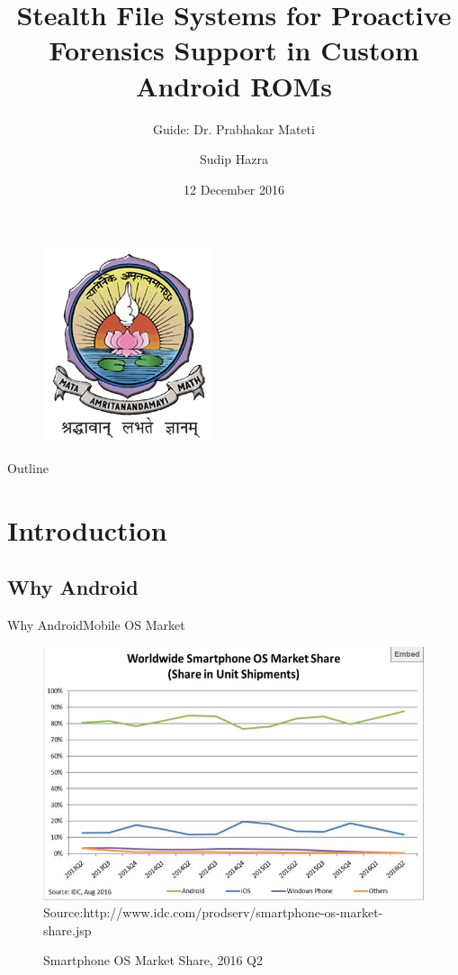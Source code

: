 \documentclass{beamer}
\title{Stealth File Systems for Proactive Forensics Support in Custom Android ROMs}
\author{Guide: Dr. Prabhakar Mateti\inst{1} \and Sudip Hazra\inst{2}}
\institute[Universities of Somewhere and Elsewhere] %
{
  \inst{1}%
  Wright State University
  \and
  \inst{2}%
  Amrita Centre For Cyber Security Systems and Networks\\
 Amrita University}
\date{12 December 2016}
\begin{document}
\begin{frame}
  \titlepage
  \centering
 
  \begin{figure}
  \centering
 \vspace{-.5cm}
  \includegraphics[width=.3\textwidth,height=.3\textheight]{images/AVV_colour}
  
  \end{figure}
  
 
\end{frame}

\begin{frame}{Outline}
  
  \begin{multicols}{3}
    \tableofcontents
  \end{multicols}
  
\end{frame}

\section{Introduction}

\subsection{Why Android}
\begin{frame}{Why Android}{Mobile OS Market}
\begin{figure}
\centering
\caption{Smartphone OS Market Share, 2016 Q2
}
\includegraphics[width=.6\textwidth,height=.5\textheight]{images/idc}
\label{imageLabel}
 \scriptsize{Source:http://www.idc.com/prodserv/smartphone-os-market-share.jsp}
\end{figure}

  
\end{frame}
\end{document}
